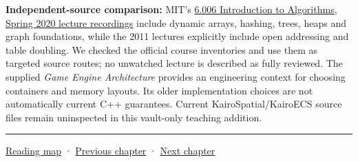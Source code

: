 \textbf{Independent-source comparison:} MIT's \href{https://ocw.mit.edu/courses/6-006-introduction-to-algorithms-spring-2020/video_galleries/lecture-videos/}{6.006 Introduction to Algorithms, Spring 2020 lecture recordings} include dynamic arrays, hashing, trees, heaps and graph foundations, while the 2011 lectures explicitly include open addressing and table doubling. We checked the official course inventories and use them as targeted source routes; no unwatched lecture is described as fully reviewed. The supplied \emph{Game Engine Architecture} provides an engineering context for choosing containers and memory layouts. Its older implementation choices are not automatically current C++ guarantees. Current KairoSpatial/KairoECS source files remain uninspected in this vault-only teaching addition.

\begin{center}\rule{0.5\linewidth}{0.5pt}\end{center}

\hyperref[volume-reading-map]{Reading map} · \hyperref[01-foundations-i-ch006]{Previous chapter} · \hyperref[01-foundations-i-ch008]{Next chapter}
